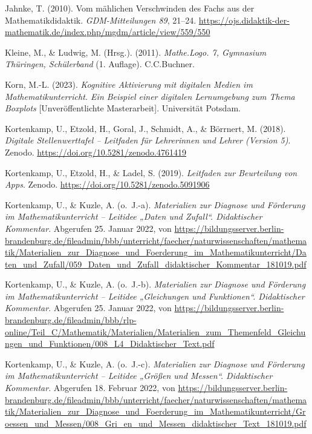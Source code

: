 \documentclass[
]{scrbook}
\newlength{\cslhangindent}
\newlength{\cslentryspacingunit} %
\newenvironment{CSLReferences}[2] %
 {%
  \setlength{\parindent}{0pt}
  \ifodd #1
  \let\oldpar\par
  \def\par{\hangindent=\cslhangindent\oldpar}
  \fi
  \setlength{\parskip}{#2\cslentryspacingunit}
 }%
 {}
\theoremstyle{definition}
\theoremstyle{definition}
\theoremstyle{definition}
\theoremstyle{definition}
\theoremstyle{remark}
\begin{document}
\begin{CSLReferences}{1}{0}
\leavevmode{}%
Jahnke, T. (2010). Vom mählichen {Verschwinden} des {Fachs} aus der {Mathematikdidaktik}. \emph{GDM-Mitteilungen 89}, 21--24. \url{https://ojs.didaktik-der-mathematik.de/index.php/mgdm/article/view/559/550}

\leavevmode{}%
Kleine, M., \& Ludwig, M. (Hrsg.). (2011). \emph{Mathe.{Logo}. 7, {Gymnasium} {Thüringen}, {Schülerband}} (1. Auflage). C.C.Buchner.

\leavevmode{}%
Korn, M.-L. (2023). \emph{Kognitive Aktivierung mit digitalen Medien im Mathematikunterricht. Ein Beispiel einer digitalen Lernumgebung zum Thema Boxplots} {[}Unveröffentlichte Masterarbeit{]}. Universität Potsdam.

\leavevmode{}%
Kortenkamp, U., Etzold, H., Goral, J., Schmidt, A., \& Börrnert, M. (2018). \emph{Digitale {Stellenwerttafel} -- {Leitfaden} für {Lehrerinnen} und {Lehrer} ({Version} 5)}. Zenodo. \url{https://doi.org/10.5281/zenodo.4761419}

\leavevmode{}%
Kortenkamp, U., Etzold, H., \& Ladel, S. (2019). \emph{Leitfaden zur {Beurteilung} von {Apps}}. Zenodo. \url{https://doi.org/10.5281/zenodo.5091906}

\leavevmode{}%
Kortenkamp, U., \& Kuzle, A. (o.~J.-a). \emph{Materialien zur {Diagnose} und {Förderung} im {Mathematikunterricht} -- {Leitidee} „{Daten} und {Zufall}``. {Didaktischer} {Kommentar}}. Abgerufen 25. Januar 2022, von \url{https://bildungsserver.berlin-brandenburg.de/fileadmin/bbb/unterricht/faecher/naturwissenschaften/mathematik/Materialien_zur_Diagnose_und_Foerderung_im_Mathematikunterricht/Daten_und_Zufall/059_Daten_und_Zufall_didaktischer_Kommentar_181019.pdf}

\leavevmode{}%
Kortenkamp, U., \& Kuzle, A. (o.~J.-b). \emph{Materialien zur {Diagnose} und {Förderung} im {Mathematikunterricht} -- {Leitidee} „{Gleichungen} und {Funktionen}``. {Didaktischer} {Kommentar}}. Abgerufen 25. Januar 2022, von \url{https://bildungsserver.berlin-brandenburg.de/fileadmin/bbb/rlp-online/Teil_C/Mathematik/Materialien/Materialien_zum_Themenfeld_Gleichungen_und_Funktionen/008_L4_Didaktischer_Text.pdf}

\leavevmode{}%
Kortenkamp, U., \& Kuzle, A. (o.~J.-c). \emph{Materialien zur {Diagnose} und {Förderung} im {Mathematikunterricht} -- {Leitidee} „{Größen} und {Messen}``. {Didaktischer} {Kommentar}}. Abgerufen 18. Februar 2022, von \url{https://bildungsserver.berlin-brandenburg.de/fileadmin/bbb/unterricht/faecher/naturwissenschaften/mathematik/Materialien_zur_Diagnose_und_Foerderung_im_Mathematikunterricht/Groessen_und_Messen/008_Gri_en_und_Messen_didaktischer_Text_181019.pdf}


\end{CSLReferences}
\end{document}
